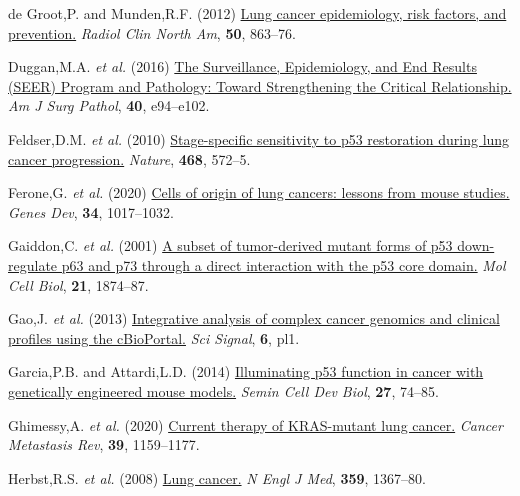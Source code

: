 \begin{CSLReferences}{1}{0}
\leavevmode{}%
de Groot,P. and Munden,R.F. (2012) \href{https://doi.org/10.1016/j.rcl.2012.06.006}{Lung cancer epidemiology, risk factors, and prevention.} \emph{Radiol Clin North Am}, \textbf{50}, 863--76.

\leavevmode{}%
Duggan,M.A. \emph{et al.} (2016) \href{https://doi.org/10.1097/pas.0000000000000749}{The Surveillance, Epidemiology, and End Results (SEER) Program and Pathology: Toward Strengthening the Critical Relationship.} \emph{Am J Surg Pathol}, \textbf{40}, e94--e102.

\leavevmode{}%
Feldser,D.M. \emph{et al.} (2010) \href{https://doi.org/10.1038/nature09535}{Stage-specific sensitivity to p53 restoration during lung cancer progression.} \emph{Nature}, \textbf{468}, 572--5.

\leavevmode{}%
Ferone,G. \emph{et al.} (2020) \href{https://doi.org/10.1101/gad.338228.120}{Cells of origin of lung cancers: lessons from mouse studies.} \emph{Genes Dev}, \textbf{34}, 1017--1032.

\leavevmode{}%
Gaiddon,C. \emph{et al.} (2001) \href{https://doi.org/10.1128/mcb.21.5.1874-1887.2001}{A subset of tumor-derived mutant forms of p53 down-regulate p63 and p73 through a direct interaction with the p53 core domain.} \emph{Mol Cell Biol}, \textbf{21}, 1874--87.

\leavevmode{}%
Gao,J. \emph{et al.} (2013) \href{https://doi.org/10.1126/scisignal.2004088}{Integrative analysis of complex cancer genomics and clinical profiles using the cBioPortal.} \emph{Sci Signal}, \textbf{6}, pl1.

\leavevmode{}%
Garcia,P.B. and Attardi,L.D. (2014) \href{https://doi.org/10.1016/j.semcdb.2013.12.014}{Illuminating p53 function in cancer with genetically engineered mouse models.} \emph{Semin Cell Dev Biol}, \textbf{27}, 74--85.

\leavevmode{}%
Ghimessy,A. \emph{et al.} (2020) \href{https://doi.org/10.1007/s10555-020-09903-9}{Current therapy of KRAS-mutant lung cancer.} \emph{Cancer Metastasis Rev}, \textbf{39}, 1159--1177.

\leavevmode{}%
Herbst,R.S. \emph{et al.} (2008) \href{https://doi.org/10.1056/nejmra0802714}{Lung cancer.} \emph{N Engl J Med}, \textbf{359}, 1367--80.


\end{CSLReferences}
